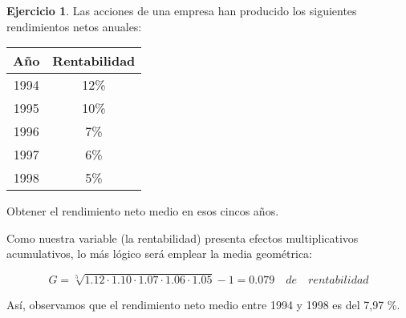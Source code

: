 \documentclass[a4paper, 12pt]{article}
\theoremstyle{definition}
\newtheorem{ej}{Ejercicio}
\begin{document}
\begin{ej}
Las acciones de una empresa han producido los siguientes rendimientos netos anuales:

\begin{center}
    \begin{tabular}{c c}
         Año & Rentabilidad  \\
         \hline
         1994 & 12\% \\
         1995 & 10\% \\
         1996 & 7\% \\
         1997 & 6\% \\
         1998 & 5\%
    \end{tabular}
\end{center}

Obtener el rendimiento neto medio en esos cincos años. \\

\begin{center}
    \end{center}

Como nuestra variable (la rentabilidad) presenta efectos multiplicativos acumulativos, lo más lógico será emplear la media geométrica:

\[
G = \sqrt[5]{1.12 \cdot 1.10 \cdot 1.07 \cdot 1.06 \cdot 1.05} -1= 0.079 \quad de \quad rentabilidad
\]

Así, observamos que el rendimiento neto medio entre 1994 y 1998 es del 7,97 \%.
\end{ej}
\end{document}
